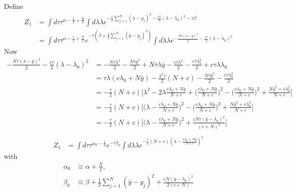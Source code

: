 Define
\begin{equation}
	\begin{split}
		Z_1 &= \int d\tau \tau^{\alpha-\frac{1}{2}+\frac{N}{2}} \int d\lambda \lambda e^{-\frac{\tau}{2}\sum_{j=1}^{N}(\lambda-y_j)^2-\frac{c\tau}{2}(\lambda-\lambda_0)^2-\tau \beta}\\
		&= \int d\tau \tau^{\alpha-\frac{1}{2}+\frac{N}{2}}e^{-\tau(\beta+\frac{1}{2}\sum_{j=1}^{N}(\bar{y}-y_j)^2)} \int d\lambda \lambda e^{-\frac{N\tau(\lambda-\bar{y})^2}{2}-\frac{c\tau}{2}(\lambda-\lambda_0)^2}
	\end{split}
\end{equation}
Now
\begin{equation}
	\begin{split}
		-\frac{N\tau(\lambda-\bar{y})^2}{2}-\frac{c\tau}{2}(\lambda-\lambda_0)^2 &= -\frac{N\tau\lambda^2}{2}-\frac{N\tau\bar{y}^2}{2}+N\tau\lambda\bar{y}-\frac{c\tau\lambda^2}{2}-\frac{c\tau\lambda_0^2}{2}+c\tau\lambda\lambda_0\\
		&=\tau\lambda(c\lambda_0+N\bar{y}) -\frac{\lambda^2\tau}{2}(N+c)-\frac{N\tau\bar{y}^2}{2}-\frac{c\tau\lambda_0^2}{2}\\
		&=-\frac{\tau}{2}(N+c)\bigg[ \lambda^2-2\lambda\frac{c\lambda_0+N\bar{y}}{N+c}+\bigg(\frac{c\lambda_0+N\bar{y}}{N+c}\bigg)^2-\bigg(\frac{c\lambda_0+N\bar{y}}{N+c}\bigg)^2+\frac{N\bar{y}^2+c\lambda_0^2}{N+c}\bigg]\\
		&=-\frac{\tau}{2}(N+c)\bigg[\bigg(\lambda-\frac{c\lambda_0+N\bar{y}}{N+c}\bigg)^2 -\bigg(\frac{c\lambda_0+N\bar{y}}{N+c}\bigg)^2+\frac{N\bar{y}^2+c\lambda_0^2}{N+c}\bigg]\\
		&=-\frac{\tau}{2}(N+c)\bigg[\bigg(\lambda-\frac{c\lambda_0+N\bar{y}}{N+c}\bigg)^2 +\frac{cN\tau(\bar{y}-\lambda_0)^2}{(c+N)^2}\bigg]\\
	\end{split}
\end{equation}
\begin{equation}
	\begin{split}
		Z_1 &= \int d\tau \tau^{\alpha_0-\frac{1}{2}}e^{-\tau\beta_0} \int d\lambda \lambda e^{-\frac{\tau}{2}(N+c)(\lambda-\frac{c\lambda_0+N\bar{y}}{N+c})^2}
	\end{split}
\end{equation}
with
\begin{equation}
	\begin{split}
		\alpha_0&\equiv \alpha+\frac{N}{2},\\
		\beta_0&\equiv \beta+\frac{1}{2}\sum_{j=1}^{N}(\bar{y}-y_j)^2+\frac{cN(\bar{y}-\lambda_0)^2}{2(c+N)}
	\end{split}
\end{equation}
